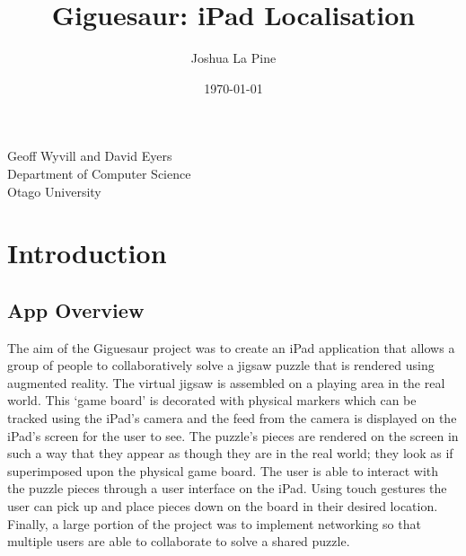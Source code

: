 \documentclass{article}
\title{Giguesaur: iPad Localisation} %
\author{Joshua La Pine} %
\date{\today} %
\begin{document}
\maketitle %

\begin{center}
\large {Geoff Wyvill and David Eyers}\\
\vspace*{1\baselineskip}
Department of Computer Science \\
Otago University \\

\end{center}
\newpage

\tableofcontents
\newpage




\section{Introduction}


\subsection{App Overview}

The aim of the Giguesaur project was to create an iPad application that allows a group of people to collaboratively solve a jigsaw puzzle that is rendered using augmented reality. The virtual jigsaw is assembled on a playing area in the real world. This `game board' is decorated with physical markers which can be tracked using the iPad's camera and the feed from the camera is displayed on the iPad's screen for the user to see. The puzzle's pieces are rendered on the screen in such a way that they appear as though they are in the real world; they look as if superimposed upon the physical game board. The user is able to interact with the puzzle pieces through a user interface on the iPad. Using touch gestures the user can pick up and place pieces down on the board in their desired location. Finally, a large portion of the project was to implement networking so that multiple users are able to collaborate to solve a shared puzzle. %
\end{document}
